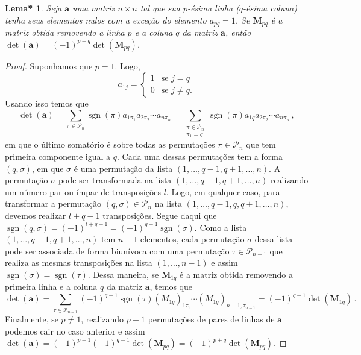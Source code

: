 \documentclass[12pt,a4paper]{report}
\newcommand{\mb}{\mathbf}
\newcommand{\mc}{\mathcal}
\newtheorem{lem*}[thm]{Lema*}
\DeclareMathOperator{\sgn}{sgn}
\begin{document}
\begin{lem*}
  \label{det.minor1}
  Seja $\mb a$ uma matriz $n\times n$ tal que sua $p$-ésima linha ($q$-ésima coluna) tenha seus elementos nulos com a exceção do elemento $a_{pq}=1$. Se $\mb M_{pq}$ é a matriz obtida removendo a linha $p$ e a coluna $q$ da matriz $\mb a$, então $\det(\mb a)=(-1)^{p+q}\det(\mb M_{pq})$.
\end{lem*}
\begin{proof}
  Suponhamos que $p=1$. Logo,
  $$a_{1j}=\begin{cases}
    1&\text{se $j=q$}\\
    0&\text{se $j\ne q$.}
  \end{cases}$$
  Usando isso temos que
  $$\det(\mb a)=\sum_{\pi\in\mc P_n}\sgn(\pi)a_{1\pi_1}a_{2\pi_2}\cdots a_{n\pi_n}=\sum_{\substack{\pi\in\mc P_n\\\pi_1=q}}\sgn(\pi)a_{1q}a_{2\pi_2}\cdots a_{n\pi_n}\,,$$
  em que o último somatório é sobre todas as permutações $\pi\in\mc P_n$ que tem primeira componente igual a $q$. Cada uma dessas permutações tem a forma $(q,\sigma)$, em que $\sigma$ é uma permutação da lista $(1,\ldots,q-1,q+1,\ldots,n)$.
  A permutação $\sigma$ pode ser transformada na lista $(1,\ldots,q-1,q+1,\ldots,n)$ realizando um número par ou ímpar de transposições $l$. Logo, em qualquer caso, para transformar a permutação $(q,\sigma)\in\mc P_n$ na lista $(1,\ldots,q-1,q,q+1,\ldots,n)$, devemos realizar $l+q-1$ transposições. Segue daqui que $\sgn(q,\sigma)=(-1)^{l+q-1}=(-1)^{q-1}\sgn(\sigma)$.
  Como a lista $(1,\ldots,q-1,q+1,\ldots,n)$ tem $n-1$ elementos, cada permutação $\sigma$ dessa lista pode ser associada de forma biunívoca com uma permutação $\tau\in\mc P_{n-1}$ que realiza as mesmas transposições na lista $(1,\ldots,n-1)$ e assim $\sgn(\sigma)=\sgn(\tau)$. Dessa maneira, se $\mb M_{1q}$ é a matriz obtida removendo a primeira linha e a coluna $q$ da matriz $\mb a$, temos que
  $$\det(\mb a)=\sum_{\tau\in\mc P_{n-1}}(-1)^{q-1}\sgn(\tau)(M_{1q})_{1\tau_1}\cdots (M_{1q})_{n-1,\tau_{n-1}}=(-1)^{q-1}\det(\mb M_{1q})\,.$$
  Finalmente, se $p\ne 1$, realizando $p-1$ permutações de pares de linhas de $\mb a$ podemos cair no caso anterior e assim $\det(\mb a)=(-1)^{p-1}(-1)^{q-1}\det(\mb M_{pq})=(-1)^{p+q}\det(\mb M_{pq})$.
\end{proof}
\end{document}
